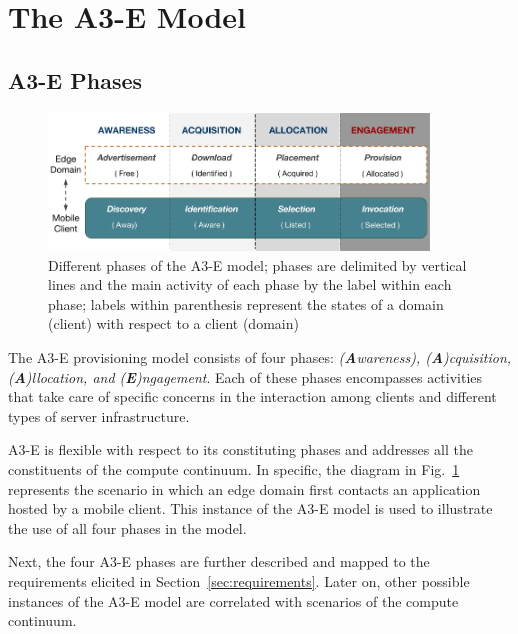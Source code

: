 \section{The A3-E Model}\label{sec:proposal}



\subsection{A3-E Phases}

\begin{figure}[tbp]
	\includegraphics[width=0.9\textwidth]{figs/A3-E.png}
	\caption{Different phases of the A3-E model; phases are delimited by vertical lines and the main activity of each phase by the label within each phase; labels within parenthesis represent the states of a domain (client) with respect to a client (domain)}
	\label{fig:A3-E-model}
\end{figure}

The A3-E provisioning model consists of four phases: \textit{(\textbf{A}wareness), (\textbf{A})cquisition, (\textbf{A})llocation, and (\textbf{E})ngagement}. Each of these phases encompasses activities that take care of specific concerns in the interaction among clients and different types of server infrastructure. 


A3-E is flexible with respect to its constituting phases and addresses all the constituents of the compute continuum. In specific, the diagram in Fig.~\ref{fig:A3-E-model} represents the scenario in which an edge domain first contacts an application hosted by a mobile client. This instance of the A3-E model is used to illustrate the use of all four phases in the model. 

Next, the four A3-E phases are further described and mapped to the requirements elicited in  Section~\ref{sec:requirements}. Later on, other possible instances of the A3-E model are correlated with scenarios of the compute continuum.

